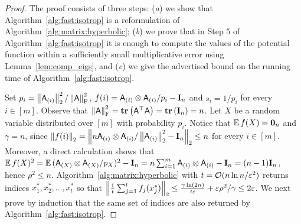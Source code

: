 \begin{proof}
The proof consists of three steps: (\emph{a}) we show that Algorithm~\ref{alg:fast:isotrop} is a reformulation of Algorithm~\ref{alg:matrix:hyperbolic}; (\emph{b}) we prove that in Step $5$ of Algorithm~\ref{alg:fast:isotrop} it is enough to compute the values of the potential function within a sufficiently small multiplicative error using Lemma~\ref{lem:comp_eigs}, and (\emph{c}) we give the advertised bound on the running time of Algorithm~\ref{alg:fast:isotrop}.
%

%
Set $p_i = \left\|{\mathsf{A} }_{(i)}\right\|_2^2/\left\|{\mathsf{A} }\right\|_{\textrm{F}}^2$, $f(i) = {\mathsf{A} }_{(i)}\otimes {\ensuremath{\mathsf{A} }}_{(i)}/p_i - \mathbf{I}_n$ and $s_i=1/p_i$ for every $i\in{[m]}$. Observe that $\left\|{\mathsf{A} }\right\|_{\textrm{F}}^2=\operatorname{\textbf{tr}}\left({\mathsf{A} }^\top {\ensuremath{\mathsf{A} }}\right) = \operatorname{\textbf{tr}}\left(\mathbf{I}_n\right) = n$. Let $X$ be a random variable distributed over $[m]$ with probability $p_i$. Notice that $\operatorname{\mathbb{E}}{f(X)} = \mathbf{0}_n$ and $\gamma = n $, since $\left\|f(i)\right\|_2 = \left\|n {\mathsf{A} }_{(i)}\otimes {\ensuremath{\mathsf{A} }}_{(i)}/\left\|{\mathsf{A} }_{(i)}\right\|_2^2 - \mathbf{I}_n \right\|_2 \leq n $ for every $i\in{[m]}$. Moreover, a direct calculation shows that $\operatorname{\mathbb{E}}{f(X)^2} = \operatorname{\mathbb{E}}{ ({\mathsf{A} }_{(X)} \otimes {\ensuremath{\mathsf{A} }}_{(X)}/p_X)^2} - \mathbf{I}_n = n\sum_{i=1}^{m} {\mathsf{A} }_{(i)}\otimes {\ensuremath{\mathsf{A} }}_{(i)} - \mathbf{I}_n = (n-1)\mathbf{I}_n $, hence $\rho^2 \leq  n$. Algorithm~\ref{alg:matrix:hyperbolic} with $t=\mathcal{O}(n\ln n /\varepsilon^2)$ returns indices $x_1^*,x_2^*,\dots, x_t^*$ so that $\left\|\frac1{t} \sum_{j=1}^t f_j(x_j^*)\right\|_2 \leq \frac{\gamma \ln ( 2n)}{t \varepsilon} + \varepsilon \rho^2 /\gamma \leq 2\varepsilon$. We next prove by induction that the same set of indices are also returned by Algorithm~\ref{alg:fast:isotrop}.
%


\end{proof}
